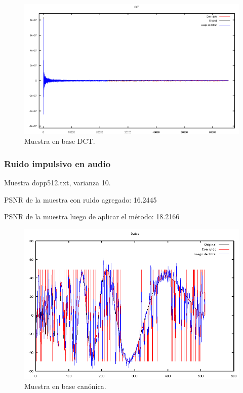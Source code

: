 \documentclass[a4paper,10pt,twoside]{article}
\begin{document}
\begin{figure}[H]
  \centering
  \includegraphics[width=15cm]{graficos/lena_aditivo_atenuar_dct.png} 
  \caption{Muestra en base DCT.}
\end{figure}


\subsubsection{Ruido impulsivo en audio}

Muestra dopp512.txt, varianza 10.

PSNR de la muestra con ruido agregado: 16.2445

PSNR de la muestra luego de aplicar el método: 18.2166

\begin{figure}[H]
  \centering
  \includegraphics[width=15cm]{graficos/dopp_impulsivo_atenuar_muestra.png} 
  \caption{Muestra en base canónica.}
\end{figure}
\end{document}
